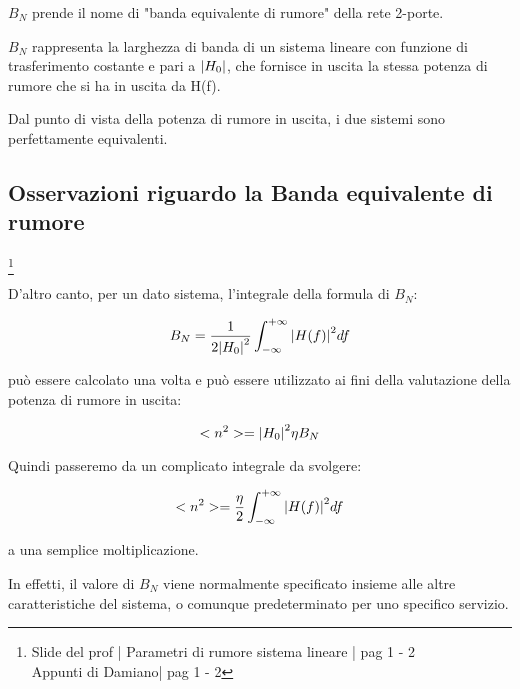 $B_N$ prende il nome di "banda equivalente di rumore" della rete 2-porte. \newline 

$B_N$ rappresenta la larghezza di banda di un sistema lineare con funzione di trasferimento costante e pari a $\abs{H_0}$, 
che fornisce in uscita la stessa potenza di rumore che si ha in uscita da H(f). \newline 

Dal punto di vista della potenza di rumore in uscita, i due sistemi sono perfettamente equivalenti. \newline 

\newpage 

\subsection{Osservazioni riguardo la Banda equivalente di rumore}
\footnote{Slide del prof | Parametri di rumore sistema lineare | pag 1 - 2\\  
Appunti di Damiano| pag 1 - 2} 

D'altro canto, per un dato sistema, l'integrale della formula di $B_N$: 

{
    \Large 
    \begin{equation}
        B_N 
            = 
            \frac{1}{2 \abs{H_0}^{2} } \int_{-\infty}^{+\infty} \abs{H(f)}^{2} df
    \end{equation}
}

può essere calcolato una volta 
e può essere utilizzato ai fini della valutazione della potenza di rumore in uscita: 

{
    \Large 
    \begin{equation}
        <n^{2}>
        = 
        \abs{H_0}^{2} \eta  B_N
    \end{equation}
}

Quindi passeremo da un complicato integrale da svolgere: 

{
    \Large 
    \begin{equation}
        <n^{2}>
        =
            \frac{\eta}{2}
             \int_{-\infty}^{+\infty}
            \abs{H(f)}^{2} 
            df
    \end{equation}
}

a una semplice moltiplicazione. \newline 

In effetti, il valore di $B_N$ viene normalmente specificato insieme alle altre caratteristiche del sistema, 
o comunque predeterminato per uno specifico servizio. \newline 

